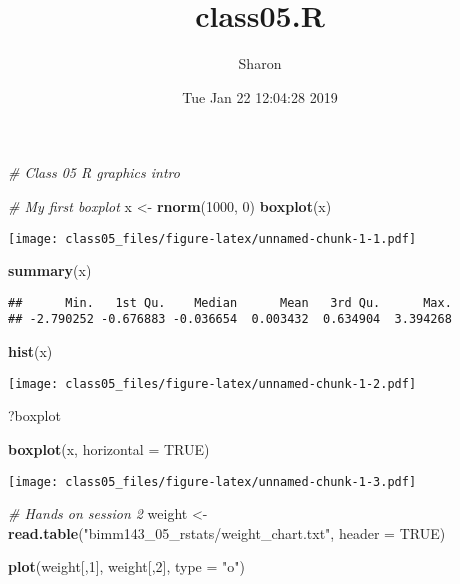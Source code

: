 \documentclass[]{article}
\title{class05.R}
\author{Sharon}
\date{Tue Jan 22 12:04:28 2019}
\newenvironment{Shaded}{\begin{snugshade}}{\end{snugshade}}
\newcommand{\KeywordTok}[1]{\textcolor[rgb]{0.13,0.29,0.53}{\textbf{#1}}}
\newcommand{\DataTypeTok}[1]{\textcolor[rgb]{0.13,0.29,0.53}{#1}}
\newcommand{\DecValTok}[1]{\textcolor[rgb]{0.00,0.00,0.81}{#1}}
\newcommand{\StringTok}[1]{\textcolor[rgb]{0.31,0.60,0.02}{#1}}
\newcommand{\CommentTok}[1]{\textcolor[rgb]{0.56,0.35,0.01}{\textit{#1}}}
\newcommand{\OtherTok}[1]{\textcolor[rgb]{0.56,0.35,0.01}{#1}}
\newcommand{\NormalTok}[1]{#1}
\begin{document}
\maketitle

\begin{Shaded}
\begin{Highlighting}[]
\CommentTok{# Class 05 R graphics intro}

\CommentTok{# My first boxplot}
\NormalTok{x <-}\StringTok{ }\KeywordTok{rnorm}\NormalTok{(}\DecValTok{1000}\NormalTok{, }\DecValTok{0}\NormalTok{)}
\KeywordTok{boxplot}\NormalTok{(x)}
\end{Highlighting}
\end{Shaded}

\texttt{[image: class05\_files/figure-latex/unnamed-chunk-1-1.pdf]}

\begin{Shaded}
\begin{Highlighting}[]
\KeywordTok{summary}\NormalTok{(x)}
\end{Highlighting}
\end{Shaded}

\begin{verbatim}
##      Min.   1st Qu.    Median      Mean   3rd Qu.      Max. 
## -2.790252 -0.676883 -0.036654  0.003432  0.634904  3.394268
\end{verbatim}

\begin{Shaded}
\begin{Highlighting}[]
\KeywordTok{hist}\NormalTok{(x)}
\end{Highlighting}
\end{Shaded}

\texttt{[image: class05\_files/figure-latex/unnamed-chunk-1-2.pdf]}

\begin{Shaded}
\begin{Highlighting}[]
\NormalTok{?boxplot}

\KeywordTok{boxplot}\NormalTok{(x, }\DataTypeTok{horizontal =} \OtherTok{TRUE}\NormalTok{)}
\end{Highlighting}
\end{Shaded}

\texttt{[image: class05\_files/figure-latex/unnamed-chunk-1-3.pdf]}

\begin{Shaded}
\begin{Highlighting}[]
 \CommentTok{# Hands on session 2}
\NormalTok{weight <-}\StringTok{ }\KeywordTok{read.table}\NormalTok{(}\StringTok{"bimm143_05_rstats/weight_chart.txt"}\NormalTok{, }\DataTypeTok{header =} \OtherTok{TRUE}\NormalTok{)}

\KeywordTok{plot}\NormalTok{(weight[,}\DecValTok{1}\NormalTok{], weight[,}\DecValTok{2}\NormalTok{], }\DataTypeTok{type =} \StringTok{"o"}\NormalTok{)}
\end{Highlighting}
\end{Shaded}
\end{document}
